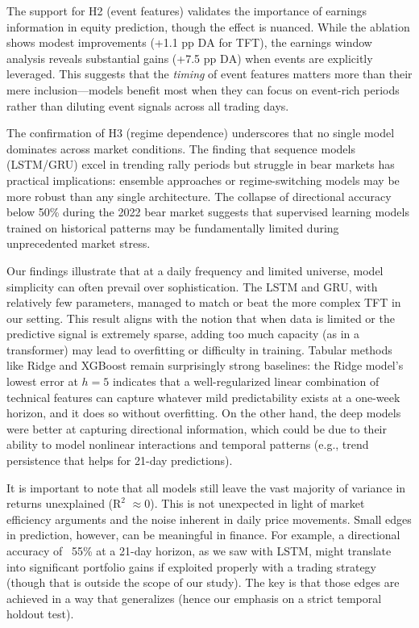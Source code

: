 \documentclass[10pt,twocolumn]{article}
\newcommand{\rTwo}{\ensuremath{\mathrm{R}^2}}
\newcommand{\da}{\ensuremath{\mathrm{DA}}}
\begin{document}
The support for H2 (event features) validates the importance of earnings information in equity prediction, though the effect is nuanced. While the ablation shows modest improvements (+1.1 pp \da{} for TFT), the earnings window analysis reveals substantial gains (+7.5 pp \da{}) when events are explicitly leveraged. This suggests that the \textit{timing} of event features matters more than their mere inclusion---models benefit most when they can focus on event-rich periods rather than diluting event signals across all trading days.

The confirmation of H3 (regime dependence) underscores that no single model dominates across market conditions. The finding that sequence models (LSTM/GRU) excel in trending rally periods but struggle in bear markets has practical implications: ensemble approaches or regime-switching models may be more robust than any single architecture. The collapse of directional accuracy below 50\% during the 2022 bear market suggests that supervised learning models trained on historical patterns may be fundamentally limited during unprecedented market stress.

Our findings illustrate that at a daily frequency and limited universe, model simplicity can often prevail over sophistication. The LSTM and GRU, with relatively few parameters, managed to match or beat the more complex TFT in our setting. This result aligns with the notion that when data is limited or the predictive signal is extremely sparse, adding too much capacity (as in a transformer) may lead to overfitting or difficulty in training. Tabular methods like Ridge and XGBoost remain surprisingly strong baselines: the Ridge model's lowest error at $h=5$ indicates that a well-regularized linear combination of technical features can capture whatever mild predictability exists at a one-week horizon, and it does so without overfitting. On the other hand, the deep models were better at capturing directional information, which could be due to their ability to model nonlinear interactions and temporal patterns (e.g., trend persistence that helps for 21-day predictions).

It is important to note that all models still leave the vast majority of variance in returns unexplained (\rTwo{} $\approx 0$). This is not unexpected in light of market efficiency arguments and the noise inherent in daily price movements. Small edges in prediction, however, can be meaningful in finance. For example, a directional accuracy of ~55\% at a 21-day horizon, as we saw with LSTM, might translate into significant portfolio gains if exploited properly with a trading strategy (though that is outside the scope of our study). The key is that those edges are achieved in a way that generalizes (hence our emphasis on a strict temporal holdout test).
\end{document}
